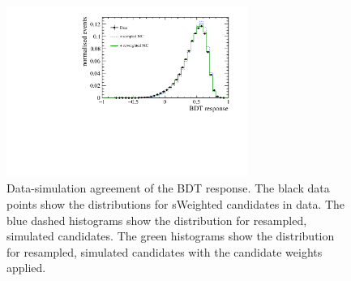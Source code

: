 \begin{figure}[!htb]
 \centering
 \includegraphics[width=0.7\textwidth]{figs/kpimm/data-mc/reweighting/BDT.pdf}
 
 \caption{Data-simulation agreement of the BDT response. The black data points show the distributions for sWeighted \BdToJPsiKst candidates in data. The blue dashed histograms show the distribution for resampled, simulated \BdToJPsiKst candidates. The green histograms show the distribution for resampled, simulated \BdToJPsiKst candidates with the candidate weights applied.}
\label{fig:data-mc:bdt}
\end{figure}